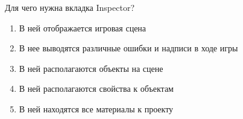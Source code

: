 
Для чего нужна вкладка Inspector?

\begin{enumerate}
    \item В ней отображается игровая сцена
    \item В нее выводятся различные ошибки и надписи в ходе игры
    \item В ней располагаются объекты на сцене
    \item В ней располагаются свойства к объектам
    \item В ней находятся все материалы к проекту
\end{enumerate}

